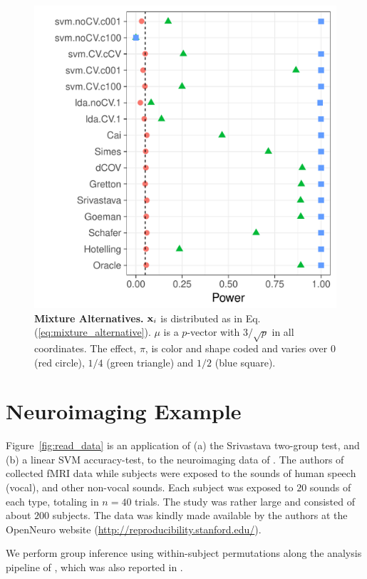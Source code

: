 \documentclass[]{bio}
\begin{document}
\begin{figure}[ht]
	\centering
	\includegraphics[width=0.7\columnwidth]{"art/file12"}
	\caption{\textbf{Mixture Alternatives.} $\mathbf{x}_i$ is distributed as in Eq.(\ref{eq:mixture_alternative}). 
		$\mu$ is a $p$-vector with $3/\sqrt{p}$ in all coordinates.
		The effect, $\pi$, is color and shape coded and varies over $0$ (red circle), $1/4$ (green triangle) and $1/2$ (blue square). }
	\label{fig:file12}
\end{figure}







\section{Neuroimaging Example}
\label{sec:example}

Figure~\ref{fig:read_data} is an application of (a) the Srivastava two-group test, and (b) a linear SVM accuracy-test, to the neuroimaging data of \citet{pernet_human_2015}. 
The authors of \cite{pernet_human_2015} collected fMRI data while subjects were exposed to the sounds of human speech (vocal), and other non-vocal sounds. 
Each subject was exposed to $20$ sounds of each type, totaling in $n=40$ trials.
The study was rather large and consisted of about $200$ subjects.
The data was kindly made available by the authors at the OpenNeuro website (\url{http://reproducibility.stanford.edu/}).

We perform group inference using within-subject permutations along the analysis pipeline of \cite{stelzer_statistical_2013}, which was also reported in \cite{gilron_quantifying_2016}. 
\end{document}

